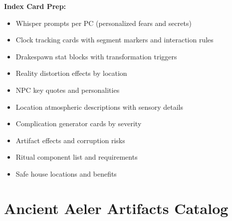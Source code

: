 \documentclass[11pt]{article}
\begin{document}
\textbf{Index Card Prep:}
\begin{itemize}
\item Whisper prompts per PC (personalized fears and secrets)
\item Clock tracking cards with segment markers and interaction rules
\item Drakespawn stat blocks with transformation triggers
\item Reality distortion effects by location
\item NPC key quotes and personalities
\item Location atmospheric descriptions with sensory details
\item Complication generator cards by severity
\item Artifact effects and corruption risks
\item Ritual component list and requirements
\item Safe house locations and benefits
\end{itemize}

\section{Ancient Aeler Artifacts Catalog}
\end{document}
